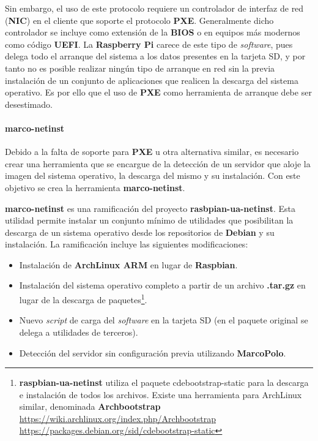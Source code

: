 Sin embargo, el uso de este protocolo requiere un controlador de interfaz de red (\textbf{NIC}) en el cliente que soporte el protocolo \textbf{PXE}. Generalmente dicho controlador se incluye como extensión de la \textbf{BIOS} o en equipos más modernos como código \textbf{UEFI}. La \textbf{Raspberry Pi} carece de este tipo de \textit{software}, pues delega todo el arranque del sistema a los datos presentes en la tarjeta SD, y por tanto no es posible realizar ningún tipo de arranque en red sin la previa instalación de un conjunto de aplicaciones que realicen la descarga del sistema operativo. Es por ello que el uso de \textbf{PXE} como herramienta de arranque debe ser desestimado.

\paragraph{marco-netinst}

Debido a la falta de soporte para \textbf{PXE} u otra alternativa similar, es necesario crear una herramienta que se encargue de la detección de un servidor que aloje la imagen del sistema operativo, la descarga del mismo y su instalación. Con este objetivo se crea la herramienta \textbf{marco-netinst}.

\textbf{marco-netinst} es una ramificación del proyecto \textbf{rasbpian-ua-netinst}\cite{raspbian-ua-netinst}. Esta utilidad permite instalar un conjunto mínimo de utilidades que posibilitan la descarga de un sistema operativo desde los repositorios de \textbf{Debian} y su instalación. La ramificación incluye las siguientes modificaciones:

\begin{itemize}
	\item Instalación de \textbf{ArchLinux ARM} en lugar de \textbf{Raspbian}.
	\item Instalación del sistema operativo completo a partir de un archivo \textbf{.tar.gz} en lugar de la descarga de paquetes\footnote{\textbf{raspbian-ua-netinst} utiliza el paquete cdebootstrap-static para la descarga e instalación de todos los archivos. Existe una herramienta para ArchLinux similar, denominada \textbf{Archbootstrap}\\
	\href{https://wiki.archlinux.org/index.php/Archbootstrap}{https://wiki.archlinux.org/index.php/Archbootstrap}\\
	\href{https://packages.debian.org/sid/cdebootstrap-static}{https://packages.debian.org/sid/cdebootstrap-static}}.
	\item Nuevo \textit{script} de carga del \textit{software} en la tarjeta SD (en el paquete original se delega a utilidades de terceros).
	\item Detección del servidor sin configuración previa utilizando \textbf{MarcoPolo}.
\end{itemize}

